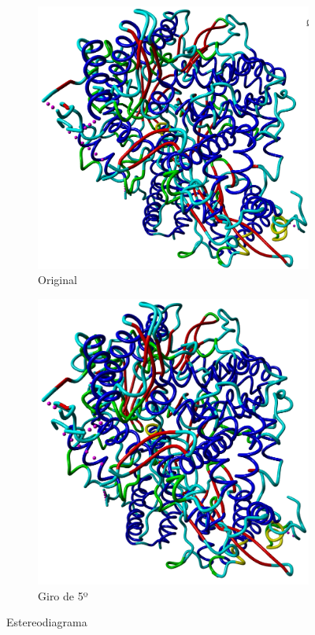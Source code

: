 \documentclass[a4paper,11pt]{report}
\begin{document}
  \begin{figure}[h!]
 	\centering
 	\begin{subfigure}{0.45\textwidth}
 		\includegraphics[width=\linewidth]{Figuras/Figura18}
 		\caption{Original }
 	\end{subfigure}   
 	\begin{subfigure}{0.45\textwidth}
 		\includegraphics[width=\linewidth]{Figuras/Figura19}
 		\caption{Giro de 5º}
 	\end{subfigure}
 	
 	\caption{Estereodiagrama}
	\label{estereo}
 \end{figure}
\end{document}
